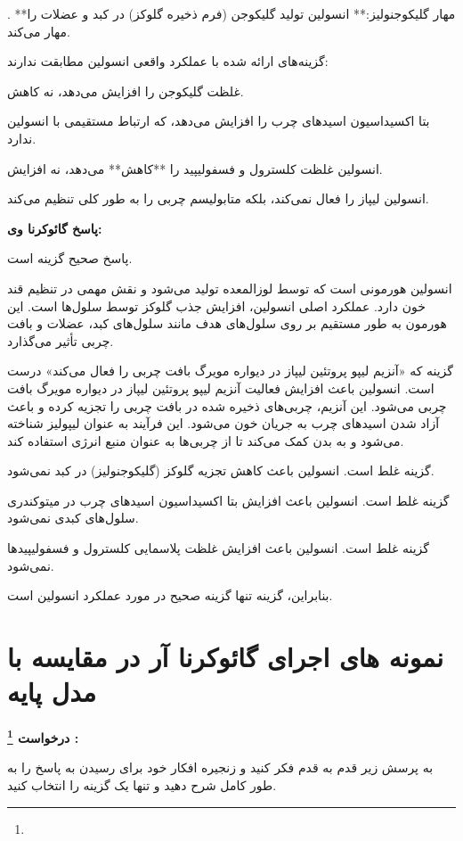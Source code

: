 .
 **مهار گلیکوجنولیز:** انسولین تولید گلیکوجن (فرم ذخیره گلوکز) در کبد و عضلات را مهار می‌کند.

گزینه‌های ارائه شده با عملکرد واقعی انسولین مطابقت ندارند:

\lr{* [A]}
غلظت گلیکوجن را افزایش می‌دهد، نه کاهش.

\lr{* [B]}
بتا اکسیداسیون اسیدهای چرب را افزایش می‌دهد، که ارتباط مستقیمی با انسولین ندارد.

\lr{* [C]}
انسولین غلظت کلسترول و فسفولیپید را **کاهش** می‌دهد، نه افزایش.

\lr{* [D]}
انسولین لیپاز را فعال نمی‌کند، بلکه متابولیسم چربی را به طور کلی تنظیم می‌کند.

\textbf{
پاسخ گائوکرنا وی:
}

پاسخ صحیح گزینه
\lr{[D]}
است.

انسولین هورمونی است که توسط لوزالمعده تولید می‌شود و نقش مهمی در تنظیم قند خون دارد. عملکرد اصلی انسولین، افزایش جذب گلوکز توسط سلول‌ها است. این هورمون به طور مستقیم بر روی سلول‌های هدف مانند سلول‌های کبد، عضلات و بافت چربی تأثیر می‌گذارد.

گزینه
\lr{[D]}
که «آنزیم لیپو پروتئین لیپاز در دیواره مویرگ بافت چربی را فعال می‌کند» درست است. انسولین باعث افزایش فعالیت آنزیم لیپو پروتئین لیپاز
در دیواره مویرگ بافت چربی می‌شود. این آنزیم، چربی‌های ذخیره شده در بافت چربی را تجزیه کرده و باعث آزاد شدن اسیدهای چرب به جریان خون می‌شود. این فرآیند به عنوان لیپولیز شناخته می‌شود و به بدن کمک می‌کند تا از چربی‌ها به عنوان منبع انرژی استفاده کند.

گزینه
\lr{[A]}
غلط است. انسولین باعث کاهش تجزیه گلوکز (گلیکوجنولیز) در کبد نمی‌شود.

گزینه
\lr{[B]}
غلط است. انسولین باعث افزایش بتا اکسیداسیون اسیدهای چرب در میتوکندری سلول‌های کبدی نمی‌شود.

گزینه
\lr{[C]}
غلط است. انسولین باعث افزایش غلظت پلاسمایی کلسترول و فسفولیپیدها نمی‌شود.

بنابراین، گزینه
\lr{[D]}
تنها گزینه صحیح در مورد عملکرد انسولین است.







\section{
نمونه های اجرای گائوکرنا آر در مقایسه با مدل پایه
}

\textbf{
درخواست
\footnote{}
:
}

به پرسش زیر قدم به قدم فکر کنید و زنجیره افکار 
خود برای رسیدن به پاسخ را به طور کامل شرح دهید و تنها یک گزینه را انتخاب کنید.

